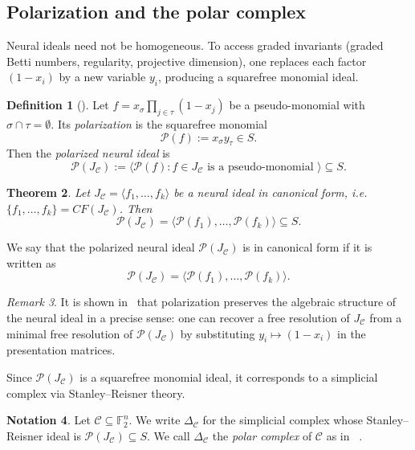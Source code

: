 \documentclass[12pt]{amsart}
\newtheorem{theorem}{Theorem}[section]
\theoremstyle{remark}
\newtheorem{remark}[theorem]{Remark}
\theoremstyle{definition}
\newtheorem{definition}[theorem]{Definition}
\newtheorem{notation}[theorem]{Notation}
\newcommand{\F}{\mathbb{F}}
\newcommand{\C}{\mathcal{C}}
\def\P{{\mathcal P}}
\begin{document}
\subsection{Polarization and the polar complex}\label{sect:neural-polarization}

Neural ideals need not be homogeneous.
To access graded invariants (graded Betti numbers, regularity, projective dimension), one replaces
each factor $(1-x_i)$ by a new variable $y_i$, producing a squarefree monomial ideal.

\begin{definition}[{\cite{gjs}}]\label{def:polarization}
Let $f=x_\sigma\prod_{j\in\tau}(1-x_j)$ be a pseudo-monomial with $\sigma\cap\tau=\emptyset$.
Its \emph{polarization} is the squarefree monomial
\[
\P(f) := x_\sigma y_\tau \in S.
\]
Then  the \emph{polarized neural ideal} is
\[
\P(J_\C) := \langle \P(f) :  f\in J_\C \text{ is a pseudo-monomial }\rangle \subseteq S.
\]
\end{definition}

\begin{theorem}\cite[Theorem 3.2]{gjs}
Let $J_\C=\langle f_1,\dots,f_k\rangle$ be a neural ideal  in canonical form, i.e.\
$\{f_1,\dots,f_k\}=CF(J_\C)$. Then 
\[
\P(J_\C)=\langle \P(f_1),\dots,\P(f_k)\rangle \subseteq S.
\]
\end{theorem}


We say that the polarized neural ideal $\P(J_\C)$ is in canonical form if it is written as
\[
\P(J_\C)=\langle \P(f_1),\dots,\P(f_k)\rangle. 
\]



\begin{remark}
It is shown in~\cite[Theorem~3.5 and Corollary~4.1]{gjs} that polarization preserves the algebraic
structure of the neural ideal in a precise sense: one can recover a free resolution of $J_\C$ from a
minimal free resolution of $\P(J_\C)$ by substituting $y_i\mapsto (1-x_i)$ in the presentation matrices.
\end{remark}

Since $\P(J_\C)$ is a squarefree monomial ideal, it corresponds to a simplicial complex via
Stanley--Reisner theory.

\begin{notation}\label{not:polar-complex}
Let $\C\subseteq\F_2^n$. We write $\Delta_\C$ for the simplicial complex whose Stanley--Reisner ideal is $\P(J_\C)\subseteq S$.
We call $\Delta_\C$ the \emph{polar complex} of $\C$ as in ~\cite{gjs}.
\end{notation}
\end{document}
